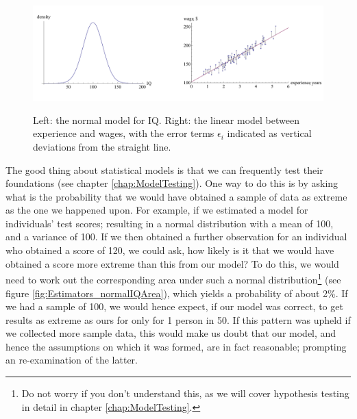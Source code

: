 \documentclass[11pt,fullpage]{book}
\begin{document}
\begin{figure}
\centering
\scalebox{0.4} 
{\includegraphics{Estimators_normalIQLinearWage.pdf}}
\caption{Left: the normal model for IQ. Right: the linear model between experience and wages, with the error terms $\epsilon_i$ indicated as vertical deviations from the straight line.}\label{fig:Estimators_normalIQLinearWage}
\end{figure}

The good thing about statistical models is that we can frequently test their foundations (see chapter \ref{chap:ModelTesting}). One way to do this is by asking what is the probability that we would have obtained a sample of data as extreme as the one we happened upon. For example, if we estimated a model for individuals' test scores; resulting in a normal distribution with a mean of 100, and a variance of 100. If we then obtained a further observation for an individual who obtained a score of 120, we could ask, how likely is it that we would have obtained a score more extreme than this from our model? To do this, we would need to work out the corresponding area under such a normal distribution\footnote{Do not worry if you don't understand this, as we will cover hypothesis testing in detail in chapter \ref{chap:ModelTesting}.} (see figure \ref{fig:Estimators_normalIQArea}), which yields a probability of about 2\%. If we had a sample of 100, we would hence expect, if our model was correct, to get results as extreme as ours for only for 1 person in 50. If this pattern was upheld if we collected more sample data, this would make us doubt that our model, and hence the assumptions on which it was formed, are in fact reasonable; prompting an re-examination of the latter.
\end{document}
